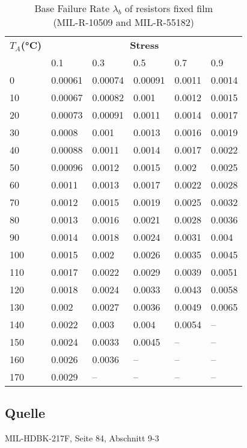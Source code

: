 \begin{table}[ht]
\begin{minipage}[t]{0.49\textwidth}
    \end{minipage}
\hfill
    \begin{minipage}[t]{0.49\textwidth}
        \vspace{0cm}
        \begin{tabular}{|p{1cm}|*{5}{p{1.1cm}|}}
            \hline
            \textbf{$T_A$(°C)} & \multicolumn{5}{c|}{\textbf{Stress}} \\
            & 0.1 & 0.3 & 0.5 & 0.7 & 0.9 \\
            \hline
            0 & 0.00061 & 0.00074 & 0.00091 & 0.0011 & 0.0014 \\
            \hline
            10 & 0.00067 & 0.00082 & 0.001 & 0.0012 & 0.0015 \\
            \hline
            20 & 0.00073 & 0.00091 & 0.0011 & 0.0014 & 0.0017 \\
            \hline
            30 & 0.0008 & 0.001 & 0.0013 & 0.0016 & 0.0019 \\
            \hline
            40 & 0.00088 & 0.0011 & 0.0014 & 0.0017 & 0.0022 \\
            \hline
            50 & 0.00096 & 0.0012 & 0.0015 & 0.002 & 0.0025 \\
            \hline
            60 & 0.0011 & 0.0013 & 0.0017 & 0.0022 & 0.0028 \\
            \hline
            70 & 0.0012 & 0.0015 & 0.0019 & 0.0025 & 0.0032 \\
            \hline
            80 & 0.0013 & 0.0016 & 0.0021 & 0.0028 & 0.0036 \\
            \hline
            90 & 0.0014 & 0.0018 & 0.0024 & 0.0031 & 0.004 \\
            \hline
            100 & 0.0015 & 0.002 & 0.0026 & 0.0035 & 0.0045 \\
            \hline
            110 & 0.0017 & 0.0022 & 0.0029 & 0.0039 & 0.0051 \\
            \hline
            120 & 0.0018 & 0.0024 & 0.0033 & 0.0043 & 0.0058 \\
            \hline
            130 & 0.002 & 0.0027 & 0.0036 & 0.0049 & 0.0065 \\
            \hline
            140 & 0.0022 & 0.003 & 0.004 & 0.0054 & -- \\
            \hline
            150 & 0.0024 & 0.0033 & 0.0045 & -- & -- \\
            \hline
            160 & 0.0026 & 0.0036 & -- & -- & -- \\
            \hline
            170 & 0.0029 & -- & -- & -- & -- \\
            \hline
        \end{tabular}
        \caption{Base Failure Rate $\lambda_b$ of resistors fixed film \\(MIL-R-10509 and MIL-R-55182)}
        \label{tab:bfr_resistors_fixed_film_10509_55182}
    \end{minipage}
\end{table}
\subsection*{Quelle}
MIL-HDBK-217F, Seite 84, Abschnitt 9-3
\restoregeometry %